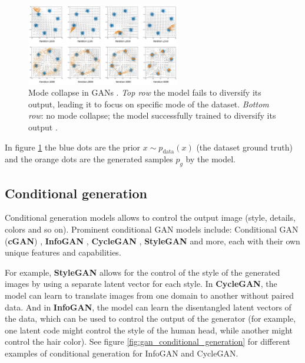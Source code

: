 \begin{figure}
    \centering
    \includegraphics[width=0.6\textwidth]{images/gan/gan_mode_collapse.png}
    \caption{Mode collapse in GANs \cite{gan_mode_collapse_image_source}. \textit{Top row} the model fails to diversify its output, leading it to focus on specific mode of the dataset. \textit{Bottom row}: no mode collapse; the model successfully trained to diversify its output \cite{gan_mode_collapse_image_source}.}
    \label{fig:gan_mode_collapse}
\end{figure}

In figure \ref{fig:gan_mode_collapse} the blue dots are the prior $x \sim p_{\text{data}}(x)$ (the dataset ground truth) and the orange dots are the generated samples $p_g$ by the model.




\subsection{Conditional generation}
\label{subsec:gan_conditional_generation}

Conditional generation models allows to control the output image (style, details, colors and so on). Prominent conditional GAN models include: Conditional GAN (\textbf{cGAN}) \cite{cgan}, \textbf{InfoGAN} \cite{infogan}, \textbf{CycleGAN} \cite{cyclegan}, \textbf{StyleGAN} \cite{stylegan} and more, each with their own unique features and capabilities. 

For example, \textbf{StyleGAN} allows for the control of the style of the generated images by using a separate latent vector for each style. In \textbf{CycleGAN}, the model can learn to translate images from one domain to another without paired data. And in \textbf{InfoGAN}, the model can learn the disentangled latent vectors of the data, which can be used to control the output of the generator (for example, one latent code might control the style of the human head, while another might control the hair color). See figure \ref{fig:gan_conditional_generation} for different examples of conditional generation for InfoGAN and CycleGAN.


